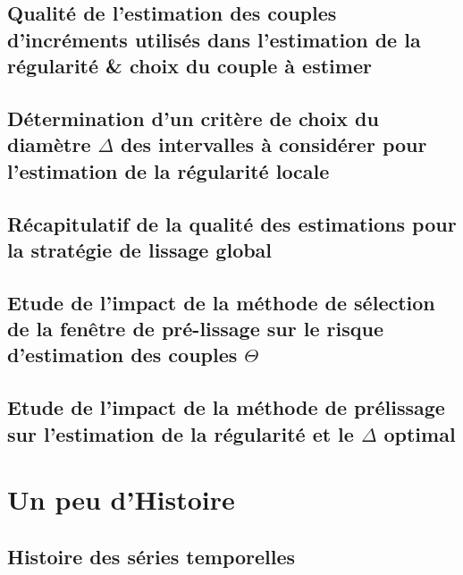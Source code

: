 \minitoc%

\section{Qualité de l'estimation des couples d'incréments utilisés dans l'estimation de la régularité \& choix du couple à estimer}
\label{annexe:choix_risque_couple}


\section{Détermination d'un critère de choix du diamètre $\Delta$ des intervalles à considérer pour l'estimation de la régularité locale}



\section{Récapitulatif de la qualité des estimations pour la stratégie de \og lissage global \fg}


\section{Etude de l'impact de la méthode de sélection de la fenêtre de pré-lissage sur le risque d'estimation des couples $\Theta$}





\section{Etude de l'impact de la méthode de prélissage sur l'estimation de la régularité et le $\Delta$ optimal}
\label{annexe:prelissage_impact}



\chapter{Un peu d'Histoire}
\label{annexe:histoire}
\section{ Histoire des séries temporelles }

\pagebreak
